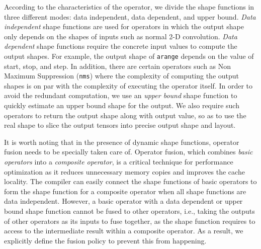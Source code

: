According to the characteristics of the operator, we divide the shape functions in three different modes: data independent, data dependent, and upper bound.
{\em Data independent} shape functions are used for operators in which the output shape only depends on the shapes of inputs such as normal 2-D convolution.
{\em Data dependent} shape functions require the concrete input values to compute the output shapes. For example, the output shape of \texttt{arange} depends on the value of start, stop, and step.
In addition, there are certain operators such as Non Maximum Suppression (\texttt{nms}) where the complexity of computing the output shapes is on par with the complexity of executing the operator itself.
In order to avoid the redundant computation, we use an {\em upper bound} shape function to quickly estimate an upper bound shape for the output.
We also require such operators to return the output shape along with output value, so as to use the real shape to slice the output tensors into precise output shape and layout.

It is worth noting that in the presence of dynamic shape functions, operator fusion needs to be specially taken care of.
Operator fusion, which combines {\em basic operators} into a {\em composite operator}, is a critical technique for performance optimization as it reduces unnecessary memory copies and improves the cache locality.
The compiler can easily connect the shape functions of basic operators to form the shape function for a composite operator when all shape functions are data independent.
However, a basic operator with a data dependent or upper bound shape function cannot be fused to other operators, i.e., taking the outputs of other operators as its inputs to fuse together, as the shape function requires to access to the intermediate result within a composite operator.
As a result, we explicitly define the fusion policy to prevent this from happening.

